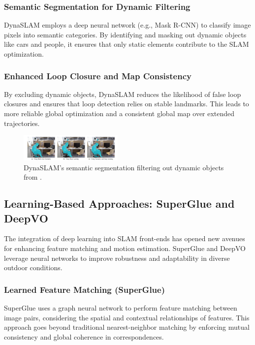 \documentclass[conference]{IEEEtran}
\begin{document}
\subsubsection{Semantic Segmentation for Dynamic Filtering}
DynaSLAM employs a deep neural network (e.g., Mask R-CNN) to classify image pixels into semantic categories. By identifying and masking out dynamic objects like cars and people, it ensures that only static elements contribute to the SLAM optimization.

\subsubsection{Enhanced Loop Closure and Map Consistency}
By excluding dynamic objects, DynaSLAM reduces the likelihood of false loop closures and ensures that loop detection relies on stable landmarks. This leads to more reliable global optimization and a consistent global map over extended trajectories.

\begin{figure}[htbp]
\centerline{\includegraphics[width=0.45\textwidth]{dynaslam.png}}
\caption{DynaSLAM’s semantic segmentation filtering out dynamic objects from \cite{6}.}
\label{fig:dynaslam}
\end{figure}

\subsection{Learning-Based Approaches: SuperGlue and DeepVO}
The integration of deep learning into SLAM front-ends has opened new avenues for enhancing feature matching and motion estimation. SuperGlue \cite{7} and DeepVO \cite{8} leverage neural networks to improve robustness and adaptability in diverse outdoor conditions.

\subsubsection{Learned Feature Matching (SuperGlue)}
SuperGlue uses a graph neural network to perform feature matching between image pairs, considering the spatial and contextual relationships of features. This approach goes beyond traditional nearest-neighbor matching by enforcing mutual consistency and global coherence in correspondences.
\end{document}
